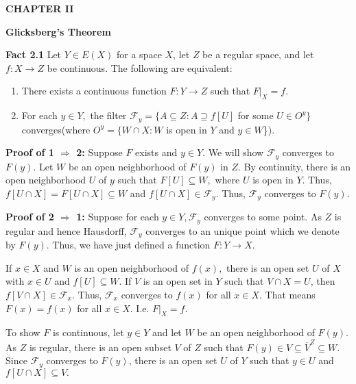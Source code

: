 \documentclass{article}
\begin{document}
\begin{center}
\textbf{CHAPTER II}
\end{center}
\vskip 5pt
\begin{center}
\textbf{Glicksberg's Theorem}
\end{center}

\vskip 35pt

\textbf{Fact 2.1}  Let $Y\in E(X)$ for a space $X$, let $Z$ be a regular space, and let $f:X \rightarrow Z$ be continuous. The following are equivalent: 
\begin{enumerate}
	\item There exists a continuous function $F: Y\rightarrow Z$ such that $F|_X=f.$
	\item For each $y\in Y,$ the filter $\mathcal{F}_y=\{A\subseteq Z: A\supseteq f[U]$ for some $U\in O^y\}$ converges(where $O^y=\{W\cap X: W$ is open in $Y$ and $y\in W$\}).

\end{enumerate}

\vskip 15pt


\textbf{Proof of 1 $\Rightarrow$ 2: } Suppose $F$ exists and $y\in Y$. We will show $\mathcal{F}_y$ converges to $F(y).$ Let $W$ be an open neighborhood of $F(y)$ in $Z$. By continuity, there is an open neighborhood $U$ of $y$ such that $F[U]\subseteq W,$ where $U$ is open in $Y$. Thus, $f\left[U\cap X\right]=F\left[U\cap X\right] \subseteq W$ and $f\left[U\cap X\right]\in \mathcal{F}_y$. Thus, $\mathcal{F}_y$ converges to $F(y)$.



\vskip 20pt


\textbf{Proof of 2 $\Rightarrow$ 1: } Suppose for each $y\in Y, \mathcal{F}_y$ converges to some point. As $Z$ is regular and hence Hausdorff, $\mathcal{F}_y$ converges to an unique point which we denote by $F(y)$. Thus, we have just defined a function $F:Y\rightarrow X$.

\vskip 10pt

If $x\in X$ and $W$ is an open neighborhood of $f(x),$ there is an open set $U$ of $X$ with $x\in U$ and $f[U]\subseteq W.$ 
If $V$ is an open set in $Y$ such that $V\cap X =U$, then $f\left[V\cap X\right] \in \mathcal{F}_x$. Thus, $\mathcal{F}_x$ converges to $f(x)$ for all $x\in X$. That means $F(x)=f(x)$ for all $x\in X$. I.e. $F|_X=f$.

\vskip 15pt

To show $F$ is continuous, let $y\in Y$ and let $W$ be an open neighborhood of $F(y)$. As $Z$ is regular, there is an open subset $V$ of $Z$ such that $F(y)\in V\subseteq \overline{V}^Z \subseteq W.$ Since $\mathcal{F}_y$ converges to $F(y)$, there is an open set $U$ of $Y$ such that $y\in U$ and $f\left[ U\cap X\right]\subseteq V.$
\end{document}
